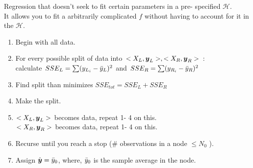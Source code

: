 \documentclass[12pt]{article}
\begin{document}
\begin{enumerate}

Regression that doesn't seek to fit certain parameters in a pre- specified $\mathcal{H}$. \\
It allows you to fit a arbitrarily complicated $f$ without having to account for it in the $\mathcal{H}$.


\begin{enumerate}[1.]
\item Begin with all data.
\item For every possible split of data into $<X_L, \boldsymbol{y}_L >, <X_R, \boldsymbol{y}_R >$ :\\
calculate $SSE_L = \sum ( y_{L_i} - \bar{y}_L )^2$ and $SSE_R = \sum ( y_{R_i} - \bar{y}_R )^2$ 
\item Find split than minimizes $SSE_{tot} = SSE_L + SSE_R$
\item Make the split. 
\item $<X_L, \boldsymbol{y}_L >$ becomes data, repeat 1- 4 on this. \\
$<X_R, \boldsymbol{y}_R >$ becomes data, repeat 1- 4 on this.
\item Recurse until you reach a stop (\# observations in a node $\leq N_0$ ).
\item Assign $\hat{\boldsymbol{y}} = \bar{y}_0$, where, $\bar{y}_0$ is the sample average in the node. 
\end{enumerate}

\end{enumerate}
\end{document}
